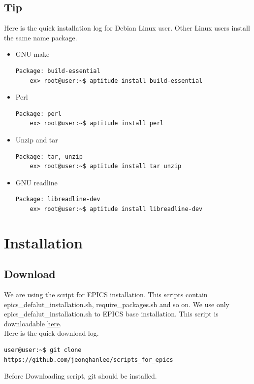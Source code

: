 \documentclass[11pt
  , a4paper
  , article
  , oneside
]{memoir}
\begin{document}
\subsection{Tip}
Here is the quick installation log for Debian Linux user. Other Linux users install the same name package. 
\begin{itemize}
	\item GNU make
\begin{lstlisting}[style=termstyle]
	Package: build-essential
	ex> root@user:~$ aptitude install build-essential
\end{lstlisting}
	\item Perl
\begin{lstlisting}[style=termstyle]
	Package: perl
	ex> root@user:~$ aptitude install perl
\end{lstlisting}
	\item Unzip and tar
\begin{lstlisting}[style=termstyle]
	Package: tar, unzip
	ex> root@user:~$ aptitude install tar unzip
\end{lstlisting}
		\item GNU readline
\begin{lstlisting}[style=termstyle]
	Package: libreadline-dev
	ex> root@user:~$ aptitude install libreadline-dev
\end{lstlisting}
\end{itemize}

\section{Installation}
\subsection{Download}
We are using the script for EPICS installation. This scripts contain epics\_defalut\_installation.sh, require\_packages.sh and so on. We use only epics\_defalut\_installation.sh to EPICS base installation. This script is downloadable \href{https://github.com/jeonghanlee/scripts_for_epics}{here}.\\ 
Here is the quick download log.
\begin{lstlisting}[style=termstyle]
user@user:~$ git clone https://github.com/jeonghanlee/scripts_for_epics
\end{lstlisting}
Before Downloading script, git should be installed.
\end{document}
